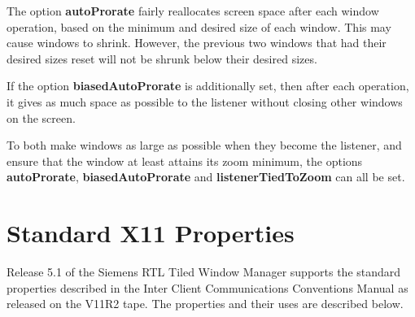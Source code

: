 The option {\bf autoProrate} fairly reallocates screen space after
each window operation, based on the minimum and desired size of each
window.  This may cause windows to shrink.  However, the previous two
windows that had their desired sizes reset will not be shrunk below their
desired sizes.

If the option {\bf biasedAutoProrate} is additionally set, then
after each operation, it gives as much space as possible to
the listener without closing other windows on the screen.

To both make windows as large as possible when they become the listener,
and ensure that the window at least attains its zoom minimum,
the options
{\bf autoProrate}, {\bf biasedAutoProrate} and {\bf listenerTiedToZoom}
can all be set.

\section{Standard X11 Properties}

Release 5.1 of the Siemens RTL Tiled Window Manager supports the standard
properties described in the Inter Client Communications Conventions
Manual as released on the V11R2 tape.
The properties and their uses are described below.

